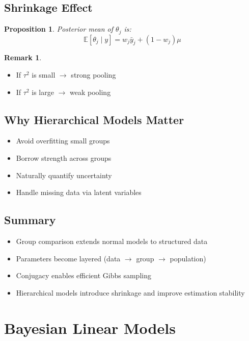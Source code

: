 \documentclass[12pt,oneside]{book}
\numberwithin{equation}{section}
\theoremstyle{definition}
\newtheorem{remark}{Remark}[section]
\theoremstyle{plain}
\newtheorem{proposition}{Proposition}[section]
\theoremstyle{remark}
\newcommand{\E}{\mathbb{E}}
\begin{document}
\section{Shrinkage Effect}

\begin{proposition}
Posterior mean of $\theta_j$ is:
$$
\E[\theta_j \mid y]
=
w_j \bar{y}_j + (1 - w_j)\mu
$$
\end{proposition}

\begin{remark}
\begin{itemize}
\item If $\tau^2$ is small $\rightarrow$ strong pooling
\item If $\tau^2$ is large $\rightarrow$ weak pooling
\end{itemize}
\end{remark}

\section{Why Hierarchical Models Matter}

\begin{itemize}
\item Avoid overfitting small groups
\item Borrow strength across groups
\item Naturally quantify uncertainty
\item Handle missing data via latent variables
\end{itemize}

\section{Summary}

\begin{itemize}
\item Group comparison extends normal models to structured data
\item Parameters become layered (data $\rightarrow$ group $\rightarrow$ population)
\item Conjugacy enables efficient Gibbs sampling
\item Hierarchical models introduce shrinkage and improve estimation stability
\end{itemize}

\chapter{Bayesian Linear Models}
\end{document}
